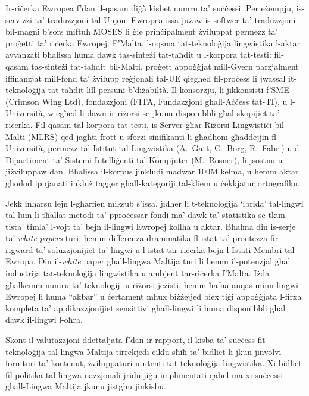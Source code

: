 \begin{multicols}{2}
Ir-riċerka Ewropea f’dan il-qasam diġà kisbet numru ta’ suċċessi. Per eżempju, is-servizzi ta’ traduzzjoni tal-Unjoni Ewropea issa jużaw is-softwer ta’ traduzzjoni bil-magni  b’sors miftuħ MOSES li ġie prinċipalment żviluppat permezz ta’ proġetti ta’ riċerka Ewropej. F’Malta, l-oqsma tat-teknoloġija lingwistika l-aktar avvanzati bħalissa huma dawk tas-sinteżi tat-taħdit u l-korpora tat-testi: fil-qasam tas-sinteżi tat-taħdit bil-Malti, proġett appoġġjat mill-Gvern parzjalment iffinanzjat mill-fond ta’ żvilupp reġjonali tal-UE qiegħed fil-proċess li jwassal it-teknoloġija tat-taħdit lill-persuni b’diżabiltà. Il-konsorzju, li jikkonsisti f’SME (Crimson Wing Ltd), fondazzjoni (FITA, Fundazzjoni għall-Aċċess tat-TI), u l-Università, wiegħed li dawn ir-riżorsi se jkunu disponibbli għal skopijiet ta’ riċerka. Fil-qasam tal-korpora tat-testi, is-Server għar-Riżorsi Lingwistiċi bil-Malti (MLRS) qed jagħti frott u sforzi sinifikanti li għadhom għaddejjin fl-Università, permezz tal-Istitut tal-Lingwistika (A.~Gatt, C.~Borg, R.~Fabri) u d-Dipartiment ta’ Sistemi Intelliġenti tal-Kompjuter (M.~Rosner), li jsostnu u jiżviluppaw dan. Bħalissa il-korpus jinkludi madwar 100M kelma, u hemm aktar għodod ippjanati inkluż tagger għall-kategoriji tal-kliem u ċekkjatur ortografiku.


Jekk inħarsu lejn l-għarfien miksub s’issa, jidher li t-teknoloġija ‘ibrida’ tal-lingwi tal-lum li tħallat metodi ta’ pproċessar fondi ma’ dawk ta’ statistika se tkun tista’ timla’ l-vojt ta’ bejn il-lingwi Ewropej kollha u aktar. Bħalma din is-serje ta’ \emph{white papers} turi, hemm differenza drammatika fl-istat ta’ prontezza fir-rigward ta’ soluzzjonijiet ta’ lingwi u l-istat tar-riċerka bejn l-Istati Membri tal-Ewropa. Din il-\emph{white} paper għall-lingwa Maltija turi li hemm il-potenzjal għal industrija tat-teknoloġija lingwistika u ambjent tar-riċerka f’Malta. Iżda għalkemm numru ta’ teknoloġiji u riżorsi jeżisti, hemm ħafna anqas minn lingwi Ewropej li huma  ``akbar'' u ċertament mhux biżżejjed biex tiġi appoġġjata l-firxa kompleta ta’ applikazzjonijiet sensittivi għall-lingwi li huma disponibbli għal dawk il-lingwi l-oħra.

Skont il-valutazzjoni ddettaljata f’dan ir-rapport, il-kisba ta’ suċċess fit-teknoloġija tal-lingwa Maltija tirrekjedi ċiklu sħiħ ta’ bidliet li jkun jinvolvi fornituri ta’ kontenut, żviluppaturi u utenti tat-teknoloġija lingwistika. Xi bidliet fil-politika tal-lingwa nazzjonali jridu jiġu implimentati qabel ma xi suċċessi għall-Lingwa Maltija jkunu jistgħu jinkisbu.


\end{multicols}
